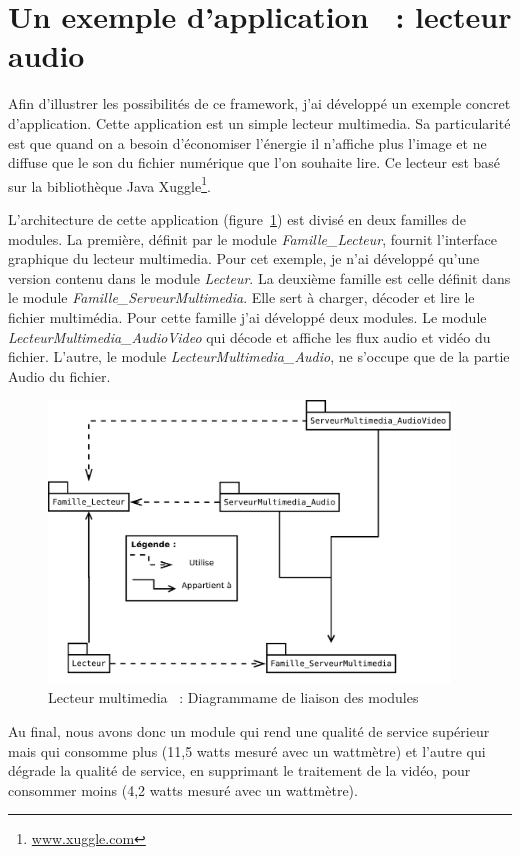 \documentclass[a4paper, 11pt]{report}
\begin{document}
	\section{Un exemple d'application ~: lecteur audio}
Afin d'illustrer les possibilités de ce framework, j'ai développé un exemple concret d'application. Cette application est un simple lecteur multimedia. Sa particularité est que quand on a besoin d'économiser l'énergie il n'affiche plus l'image et ne diffuse que le son du fichier numérique que l'on souhaite lire. Ce lecteur est basé sur la bibliothèque Java Xuggle\footnote{\href{http://www.xuggle.com/}{www.xuggle.com}}.

L'architecture de cette application (figure~\ref{lecMult}) est divisé en deux familles de modules. La première, définit par le module \textit{Famille\_Lecteur}, fournit l'interface graphique du lecteur multimedia. Pour cet exemple, je n'ai développé qu'une version contenu dans le module \textit{Lecteur}. La deuxième famille est celle définit dans le module \textit{Famille\_ServeurMultimedia}. Elle sert à charger, décoder et lire le fichier multimédia. Pour cette famille j'ai développé deux modules. Le module \textit{LecteurMultimedia\_AudioVideo} qui décode et affiche les flux audio et vidéo du fichier. L'autre, le module \textit{LecteurMultimedia\_Audio}, ne s'occupe que de la partie Audio du fichier.

\begin{figure}
	\centering
	\includegraphics[width=0.95\textwidth]{figures/EcoPattern_LecteurMultimedia}
	\caption{Lecteur multimedia ~: Diagrammame de liaison des modules}
	\label{lecMult}
\end{figure}

Au final, nous avons donc un module qui rend une qualité de service supérieur mais qui consomme plus (11,5 watts mesuré avec un wattmètre) et l'autre qui dégrade la qualité de service, en supprimant le traitement de la vidéo, pour consommer moins (4,2 watts mesuré avec un wattmètre).
	
\end{document}
